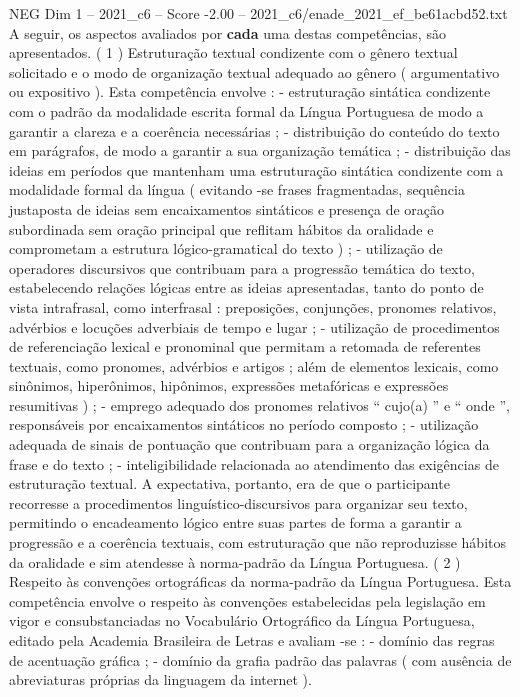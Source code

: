 \begin{textsample}{NEG Dim 1 – 2021\_c6 – Score -2.00 – 2021\_c6/enade\_2021\_ef\_be61acbd52.txt}
A seguir, os aspectos avaliados por \textbf{cada} uma destas competências, são apresentados. ( 1 ) Estruturação textual condizente com o gênero textual solicitado e o modo de organização textual adequado ao gênero ( argumentativo ou expositivo ).
Esta competência envolve : - estruturação sintática condizente com o padrão da modalidade escrita formal da Língua Portuguesa de modo a garantir a clareza e a coerência necessárias ; - distribuição do conteúdo do texto em parágrafos, de modo a garantir a sua organização temática ; - distribuição das ideias em períodos que mantenham uma estruturação sintática condizente com a modalidade formal da língua ( evitando -se frases fragmentadas, sequência justaposta de ideias sem encaixamentos sintáticos e presença de oração subordinada sem oração principal que reflitam hábitos da oralidade e comprometam a estrutura lógico-gramatical do texto ) ; - utilização de operadores discursivos que contribuam para a progressão temática do texto, estabelecendo relações lógicas entre as ideias apresentadas, tanto do ponto de vista intrafrasal, como interfrasal : preposições, conjunções, pronomes relativos, advérbios e locuções adverbiais de tempo e lugar ; - utilização de procedimentos de referenciação lexical e pronominal que permitam a retomada de referentes textuais, como pronomes, advérbios e artigos ; além de elementos lexicais, como sinônimos, hiperônimos, hipônimos, expressões metafóricas e expressões resumitivas ) ; - emprego adequado dos pronomes relativos “ cujo(a) ” e “ onde ”, responsáveis por encaixamentos sintáticos no período composto ; - utilização adequada de sinais de pontuação que contribuam para a organização lógica da frase e do texto ; - inteligibilidade relacionada ao atendimento das exigências de estruturação textual.
A expectativa, portanto, era de que o participante recorresse a procedimentos linguístico-discursivos para organizar seu texto, permitindo o encadeamento lógico entre suas partes de forma a garantir a progressão e a coerência textuais, com estruturação que não reproduzisse hábitos da oralidade e sim atendesse à norma-padrão da Língua Portuguesa. ( 2 ) Respeito às convenções ortográficas da norma-padrão da Língua Portuguesa.
Esta competência envolve o respeito às convenções estabelecidas pela legislação em vigor e consubstanciadas no Vocabulário Ortográfico da Língua Portuguesa, editado pela Academia Brasileira de Letras e avaliam -se : - domínio das regras de acentuação gráfica ; - domínio da grafia padrão das palavras ( com ausência de abreviaturas próprias da linguagem da internet ).

\end{textsample}

